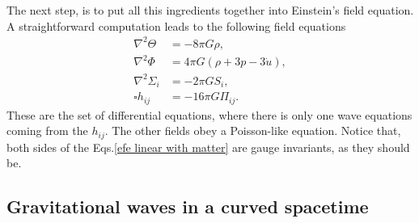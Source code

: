\documentclass{article}
\begin{document}
The next step, is to put all this ingredients together into Einstein's field equation. A 
straightforward computation leads to the following field equations
\begin{align}
    \label{efe linear with matter}
    \nabla^2 \Theta & = -8\pi G\rho, \\
    \nabla^2 \Phi & = 4\pi G\left(\rho + 3p - 3\dot{u}\right), \\
    \nabla^2 \Sigma_{i} & = - 2\pi G S_{i}, \\
    \square h_{ij} & = -16\pi G\Pi_{ij}.
\end{align}
These are the set of differential equations, where there is only one wave equations coming
from the $h_{ij}$. The other fields obey a Poisson-like equation. Notice that, both sides of 
the Eqs.\eqref{efe linear with matter} are gauge invariants, as they should be.

\subsection{Gravitational waves in a curved spacetime}
\end{document}
